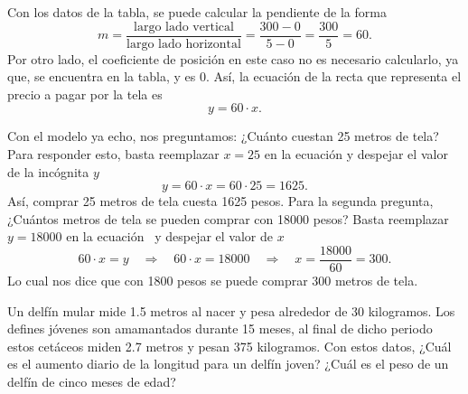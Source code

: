 \documentclass{ceas2}
\begin{document}
\begin{center}    
\end{center}
Con los datos de la tabla, se puede calcular la pendiente de la forma
\begin{equation*}
    m = \dfrac{\text{largo lado vertical}}{\text{largo lado horizontal}} = \dfrac{300 - 0}{5 - 0} = \dfrac{300}{5} = 60.
\end{equation*}
Por otro lado, 
el coeficiente de posición en este caso no es necesario calcularlo, ya que, se
encuentra en la tabla, y es 0. Así, la ecuación de la recta que
representa el precio a pagar por la tela es 
\begin{equation}\label{eq:1}
    y = 60\cdot x.
\end{equation}

Con el modelo ya echo, nos preguntamos: 
¿Cuánto cuestan 25 metros de tela? Para responder esto, basta reemplazar $x=25$ en la
ecuación  y despejar el valor de la incógnita $y$
\begin{equation*}
    y = 60\cdot x = 60\cdot 25 = 1625.
\end{equation*} 
Así, comprar 25 metros de tela cuesta 1625 pesos. Para la segunda pregunta, ¿Cuántos
metros de tela se pueden comprar con 18000 pesos? Basta reemplazar $y=18000$
en la ecuación  y despejar el valor de $x$
\begin{equation*}
    60\cdot x = y \quad\Rightarrow\quad 60\cdot x = 18000 \quad\Rightarrow\quad x =\dfrac{18000}{60} = 300.
\end{equation*}
Lo cual nos dice que con 1800 pesos se puede comprar 300 metros de tela.

\e Un delfín mular mide 1.5 metros al nacer y pesa alrededor de 30 kilogramos. Los 
defines jóvenes son amamantados durante 15 meses, al final de dicho periodo 
estos cetáceos miden 2.7 metros y pesan 375 kilogramos. Con estos datos, 
¿Cuál es el aumento 
diario de la longitud para un delfín joven? ¿Cuál es el peso de un delfín de 
cinco meses de edad?
\end{document}
